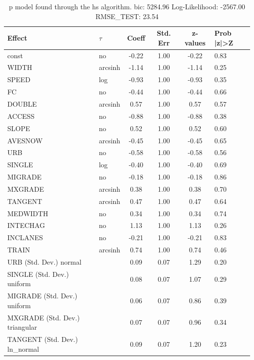 \begin{table}
	\caption{p model found through the hs algorithm. bic: 5284.96 Log-Likelihood: -2567.00 RMSE_TEST: 23.54}
	\begin{center}
		\begin{tabular}{|l|l|c|c|c|l|}
			\hline
			Effect & $\tau$ & Coeff & Std. Err & z-values & Prob |z|>Z \\
			\hline
			const & no & -0.22 & 1.00 & -0.22 & 0.83 \\
			\hline
			WIDTH & arcsinh & -1.14 & 1.00 & -1.14 & 0.25 \\
			\hline
			SPEED & log & -0.93 & 1.00 & -0.93 & 0.35 \\
			\hline
			FC & no & -0.44 & 1.00 & -0.44 & 0.66 \\
			\hline
			DOUBLE & arcsinh & 0.57 & 1.00 & 0.57 & 0.57 \\
			\hline
			ACCESS & no & -0.88 & 1.00 & -0.88 & 0.38 \\
			\hline
			SLOPE & no & 0.52 & 1.00 & 0.52 & 0.60 \\
			\hline
			AVESNOW & arcsinh & -0.45 & 1.00 & -0.45 & 0.65 \\
			\hline
			URB & no & -0.58 & 1.00 & -0.58 & 0.56 \\
			\hline
			SINGLE & log & -0.40 & 1.00 & -0.40 & 0.69 \\
			\hline
			MIGRADE & no & -0.18 & 1.00 & -0.18 & 0.86 \\
			\hline
			MXGRADE & arcsinh & 0.38 & 1.00 & 0.38 & 0.70 \\
			\hline
			TANGENT & arcsinh & 0.47 & 1.00 & 0.47 & 0.64 \\
			\hline
			MEDWIDTH & no & 0.34 & 1.00 & 0.34 & 0.74 \\
			\hline
			INTECHAG & no & 1.13 & 1.00 & 1.13 & 0.26 \\
			\hline
			INCLANES & no & -0.21 & 1.00 & -0.21 & 0.83 \\
			\hline
			TRAIN & arcsinh & 0.74 & 1.00 & 0.74 & 0.46 \\
			\hline
			URB (Std. Dev.) normal &  & 0.09 & 0.07 & 1.29 & 0.20 \\
			\hline
			SINGLE (Std. Dev.) uniform &  & 0.08 & 0.07 & 1.07 & 0.29 \\
			\hline
			MIGRADE (Std. Dev.) uniform &  & 0.06 & 0.07 & 0.86 & 0.39 \\
			\hline
			MXGRADE (Std. Dev.) triangular &  & 0.07 & 0.07 & 0.96 & 0.34 \\
			\hline
			TANGENT (Std. Dev.) ln_normal &  & 0.09 & 0.07 & 1.20 & 0.23 \\

\end{tabular}
\end{center}
\end{table}
